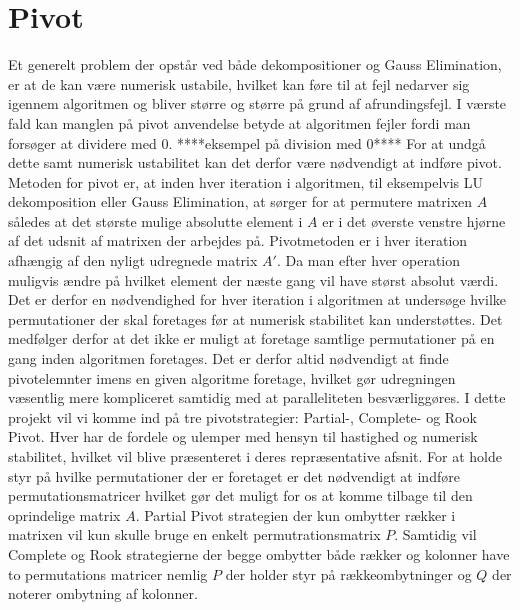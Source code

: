 \documentclass{article}
\begin{document}
\section{Pivot}
Et generelt problem der opstår ved både dekompositioner og Gauss Elimination, er at de kan være numerisk ustabile, hvilket kan føre til at fejl nedarver sig igennem algoritmen og bliver større og større på grund af afrundingsfejl.
I værste fald kan manglen på pivot anvendelse betyde at algoritmen fejler fordi man forsøger at dividere med $0$.
\newline\newline
****eksempel på division med $0$****
\newline\newline
For at undgå dette samt numerisk ustabilitet kan det derfor være nødvendigt at indføre pivot. Metoden for pivot er, at inden hver iteration i algoritmen, til eksempelvis LU dekomposition eller Gauss Elimination, at sørger for at permutere matrixen $A$ således at det største mulige absolutte element i $A$ er i det øverste venstre hjørne af det udsnit af matrixen der arbejdes på.
\newline
Pivotmetoden er i hver iteration afhængig af den nyligt udregnede matrix $A'$. Da man efter hver operation muligvis ændre på hvilket element der næste gang vil have størst absolut værdi. Det er derfor en nødvendighed for hver iteration i algoritmen at undersøge hvilke permutationer der skal foretages før at numerisk stabilitet kan understøttes. Det medfølger derfor at det ikke er muligt at foretage samtlige permutationer på en gang inden algoritmen foretages. Det er derfor altid nødvendigt at finde pivotelemnter imens en given algoritme foretage, hvilket gør udregningen væsentlig mere kompliceret samtidig med at paralleliteten besværliggøres.
I dette projekt vil vi komme ind på tre pivotstrategier: Partial-, Complete- og Rook Pivot. Hver har de fordele og ulemper med hensyn til hastighed og numerisk stabilitet, hvilket vil blive præsenteret i deres repræsentative afsnit.
\newline\newline
For at holde styr på hvilke permutationer der er foretaget er det nødvendigt at indføre permutationsmatricer hvilket gør det muligt for os at komme tilbage til den oprindelige matrix $A$. Partial Pivot strategien der kun ombytter rækker i matrixen vil kun skulle bruge en enkelt permutrationsmatrix $P$. Samtidig vil Complete og Rook strategierne der begge ombytter både rækker og kolonner have to permutations matricer nemlig $P$ der holder styr på rækkeombytninger og $Q$ der noterer ombytning af kolonner.
\end{document}
